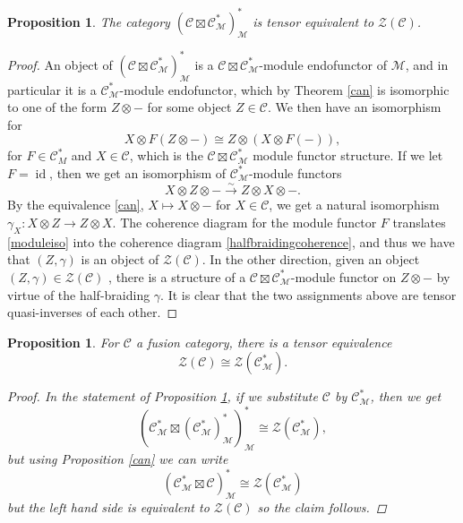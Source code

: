 \documentclass[a4paper, 10pt]{book}
\newtheorem{Prop}[theorem]{Proposition}
\theoremstyle{definition}
\numberwithin{equation}{chapter}
\newcommand\id{\operatorname{id}}
\newcommand\ot{\otimes}
\newcommand\M{\mathcal{M}}
\newcommand\C{\mathcal C}
\newcommand\CTR{\mathcal Z}
\newcommand{\ra}\rightarrow
\newcommand{\xra}\xrightarrow
\begin{document}
\begin{Prop}\label{centereqv}
The category $(\C\boxtimes \C^*_\M)^*_\M$ is tensor equivalent to $\CTR(\C)$.
\end{Prop}
\begin{proof}
An object of $(\C\boxtimes \C^*_\M)^*_\M$ is a $\C\boxtimes \C^*_\M$-module endofunctor of $\M$, and in particular it is a $\C^*_\M$-module endofunctor, which by Theorem \ref{can} is isomorphic to one of the form $Z\ot -$ for some object $Z\in \C$. We then have an isomorphism for \begin{equation}
	X\ot F(Z\ot -) \cong Z\ot(X\ot F(-)),\label{moduleiso}
\end{equation}for $F\in \C^*_M$ and $X \in \C$, which is the $\C \boxtimes \C^*_\M$ module functor structure. If we let $F=\id$, then we get an isomorphism of $\C^*_\M$-module functors \begin{equation}
	X\ot Z \ot -\xra{\sim} Z\ot X\ot -.
\end{equation}
By the equivalence \ref{can}, $X\mapsto X\ot -$ for $X\in \C$, we get a natural isomorphism $\gamma_X: X\ot Z \ra Z \ot X$. The coherence diagram for the module functor $F$ translates \eqref{moduleiso} into the coherence diagram \eqref{halfbraidingcoherence}, and thus we have that  $(Z, \gamma)$ is an object of $\CTR(\C)$. In the other direction, given an object $(Z, \gamma) \in \CTR(\C)$ , there is a structure of a $\C\boxtimes \C^*_\M$-module functor on $Z\ot -$ by virtue of the half-braiding $\gamma$. It is clear that the two assignments above are tensor quasi-inverses of each other.
\end{proof}
\begin{Prop}
For $\C$ a fusion category, there is a tensor equivalence \begin{equation}
	\CTR(\C)\cong \CTR(\C^*_\M).
\end{equation}
\begin{proof}
In the statement of Proposition \ref{centereqv}, if we substitute $\C$ by $\C^*_\M$, then we get 
\begin{equation}
	(\C^*_\M \boxtimes (\C^*_\M)^*_\M)^*_\M \cong \CTR(\C^*_\M),
\end{equation} but using Proposition \ref{can} we can write \begin{equation}
	(\C^*_\M \boxtimes \C)^*_\M \cong \CTR(\C^*_\M)
\end{equation} but the left hand side is equivalent to $\CTR(\C)$ so the claim follows.
\end{proof}
\end{Prop}
\end{document}
